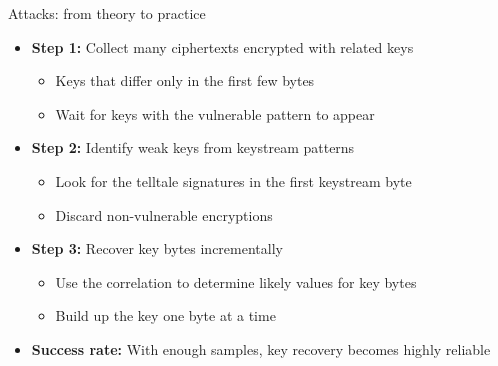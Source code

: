 \documentclass[aspectratio=169, lualatex, handout]{beamer}
\begin{document}
\begin{frame}{Attacks: from theory to practice}
	\begin{itemize}[<+->]
		\item \textbf{Step 1:} Collect many ciphertexts encrypted with related keys
		      \begin{itemize}[<+->]
			      \item Keys that differ only in the first few bytes
			      \item Wait for keys with the vulnerable pattern to appear
		      \end{itemize}
		\item \textbf{Step 2:} Identify weak keys from keystream patterns
		      \begin{itemize}[<+->]
			      \item Look for the telltale signatures in the first keystream byte
			      \item Discard non-vulnerable encryptions
		      \end{itemize}
		\item \textbf{Step 3:} Recover key bytes incrementally
		      \begin{itemize}[<+->]
			      \item Use the correlation to determine likely values for key bytes
			      \item Build up the key one byte at a time
		      \end{itemize}
		\item \textbf{Success rate:} With enough samples, key recovery becomes highly reliable
	\end{itemize}
\end{frame}
\end{document}
